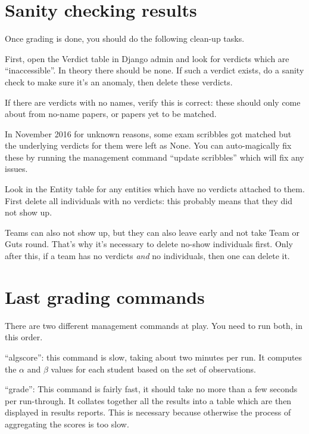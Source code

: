 \section{Sanity checking results}
Once grading is done, you should do the following clean-up tasks.
\begin{itemize}
	\ii First, open the Verdict table in Django admin and look for verdicts which
	are ``inaccessible''.
	In theory there should be none.
	If such a verdict exists, do a sanity check to make sure it's an anomaly,
	then delete these verdicts.

	\ii If there are verdicts with no names, verify this is correct:
	these should only come about from no-name papers,
	or papers yet to be matched.

	In November 2016 for unknown reasons, some exam scribbles got matched
	but the underlying verdicts for them were left as None.
	You can auto-magically fix these by running the
	management command ``update scribbles''
	which will fix any issues.

	\ii Look in the Entity table for any entities which have
	no verdicts attached to them.
	First delete all individuals with no verdicts:
	this probably means that they did not show up.

	Teams can also not show up,
	but they can also leave early and not take Team or Guts round.
	That's why it's necessary to delete no-show individuals first.
	Only after this, if a team has no verdicts \emph{and} no individuals,
	then one can delete it.
\end{itemize}

\section{Last grading commands}
There are two different management commands at play.
You need to run both, in this order.

\begin{itemize} 
	\ii ``algscore'': this command is slow, taking about two minutes per run.
	It computes the $\alpha$ and $\beta$ values for each student
	based on the set of observations.

	\ii ``grade'': This command is fairly fast, it should take no more than
	a few seconds per run-through.
	It collates together all the results into a table which
	are then displayed in results reports.
	This is necessary because otherwise the process of aggregating the scores
	is too slow.
\end{itemize}

